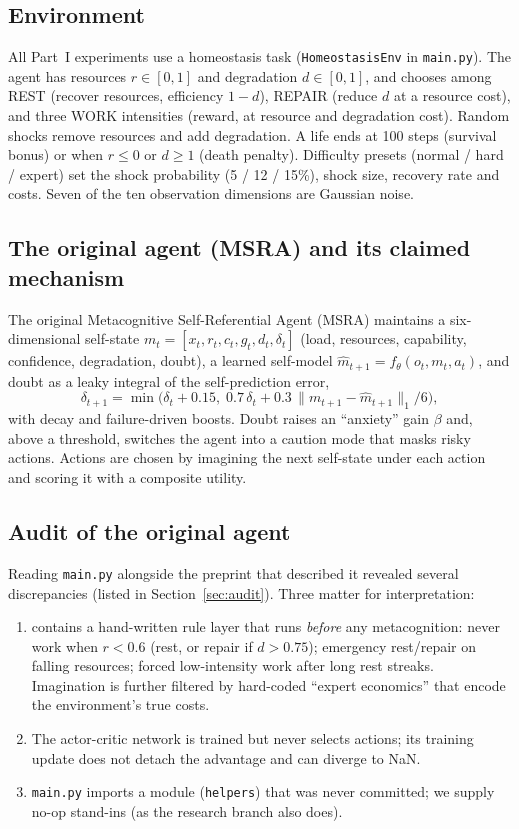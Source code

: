 \documentclass[11pt]{article}
\theoremstyle{remark}
\newcommand{\pct}{\%}
\begin{document}
\subsection{Environment}
All Part~I experiments use a homeostasis task (\texttt{HomeostasisEnv} in \texttt{main.py}). The agent has
resources $r\in[0,1]$ and degradation $d\in[0,1]$, and chooses among REST (recover resources, efficiency
$1-d$), REPAIR (reduce $d$ at a resource cost), and three WORK intensities (reward, at resource and degradation
cost). Random shocks remove resources and add degradation. A life ends at 100 steps (survival bonus) or when
$r\le0$ or $d\ge1$ (death penalty). Difficulty presets (normal / hard / expert) set the shock probability
(5 / 12 / 15\pct), shock size, recovery rate and costs. Seven of the ten observation dimensions are Gaussian noise.

\subsection{The original agent (MSRA) and its claimed mechanism}
The original Metacognitive Self-Referential Agent (MSRA) maintains a six-dimensional self-state
$m_t=[x_t,r_t,c_t,g_t,d_t,\delta_t]$ (load, resources, capability, confidence, degradation, doubt), a learned
self-model $\hat m_{t+1}=f_\theta(o_t,m_t,a_t)$, and doubt as a leaky integral of the self-prediction error,
\begin{equation}
\delta_{t+1}=\min\!\big(\delta_t+0.15,\;0.7\,\delta_t+0.3\,\lVert m_{t+1}-\hat m_{t+1}\rVert_1/6\big),
\label{eq:doubt}
\end{equation}
with decay and failure-driven boosts. Doubt raises an ``anxiety'' gain $\beta$ and, above a threshold, switches
the agent into a caution mode that masks risky actions. Actions are chosen by imagining the next self-state
under each action and scoring it with a composite utility.

\subsection{Audit of the original agent}
\label{sec:msra-audit}
Reading \texttt{main.py} alongside the preprint that described it revealed several discrepancies (listed in
Section~\ref{sec:audit}). Three matter for interpretation:
\begin{enumerate}
  \item {} contains a hand-written rule layer that runs \emph{before} any metacognition:
        never work when $r<0.6$ (rest, or repair if $d>0.75$); emergency rest/repair on falling resources; forced
        low-intensity work after long rest streaks. Imagination is further filtered by hard-coded ``expert
        economics'' that encode the environment's true costs.
  \item The actor-critic network is trained but never selects actions; its training update does not detach the
        advantage and can diverge to NaN.
  \item \texttt{main.py} imports a module (\texttt{helpers}) that was never committed; we supply no-op stand-ins
        (as the research branch also does).
\end{enumerate}
\end{document}
